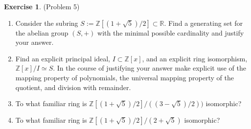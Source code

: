 \documentclass[12pt, psamsfonts]{amsart}
\theoremstyle{definition}
\newtheorem*{exer}{Exercise}
\theoremstyle{remark}
\numberwithin{equation}{section}
\begin{document}
\begin{exer}{(Problem 5)}
  $ $
  \begin{enumerate}
    \item
      Consider the subring $S := \mathbb{Z}[(1 + \sqrt{5})/2] \subset \mathbb{R}$.
      Find a generating set for the abelian group $(S, +)$ with the minimal possible cardinality and justify your answer.
    \item
      Find an explicit principal ideal, $I \subset \mathbb{Z}[x]$, and an explicit ring isomorphism, $\mathbb{Z}[x]/I \simeq S$.
      In the course of justifying your answer make explicit use of the mapping property of polynomials, the universal mapping property of the quotient, and division with remainder.
    \item
      To what familiar ring is $\mathbb{Z}[(1 + \sqrt{5}) / 2] / ((3 - \sqrt{5}) / 2))$ isomorphic?
    \item
      To what familiar ring is $\mathbb{Z}[(1 + \sqrt{5}) / 2] / (2 + \sqrt{5})$ isomorphic?
  \end{enumerate}
\end{exer}
\end{document}
